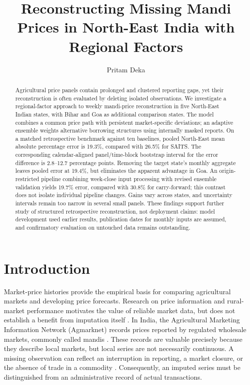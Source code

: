 \documentclass[sigconf,nonacm,balance=false]{acmart}
\begin{document}
\title{Reconstructing Missing Mandi Prices in North-East India with Regional Factors}
\author{Pritam Deka}

\begin{abstract}
Agricultural price panels contain prolonged and clustered reporting gaps, yet their reconstruction is often evaluated by deleting isolated observations. We investigate a regional-factor approach to weekly mandi-price reconstruction in five North-East Indian states, with Bihar and Goa as additional comparison states. The model combines a common price path with persistent market-specific deviations; an adaptive ensemble weights alternative borrowing structures using internally masked reports. On a matched retrospective benchmark against ten baselines, pooled North-East mean absolute percentage error is 19.3\%, compared with 26.5\% for SAITS. The corresponding calendar-aligned panel/time-block bootstrap interval for the error difference is 2.8--12.7 percentage points. Removing the target state's monthly aggregate leaves pooled error at 19.4\%, but eliminates the apparent advantage in Goa. An origin-restricted pipeline combining week-close input processing with revised ensemble validation yields 19.7\% error, compared with 30.8\% for carry-forward; this contrast does not isolate individual pipeline changes. Gains vary across states, and uncertainty intervals remain too narrow in several small panels. These findings support further study of structured retrospective reconstruction, not deployment claims: model development used earlier results, publication dates for monthly inputs are assumed, and confirmatory evaluation on untouched data remains outstanding.
\end{abstract}

\maketitle

\section{Introduction}

Market-price histories provide the empirical basis for comparing agricultural markets and developing price forecasts. Research on price information and rural-market performance motivates the value of reliable market data, but does not establish a benefit from imputation itself \cite{goyal2010}. In India, the Agricultural Marketing Information Network (Agmarknet) records prices reported by regulated wholesale markets, commonly called mandis \cite{agmarknet}. These records are valuable precisely because they describe local markets, but local series are not necessarily continuous. A missing observation can reflect an interruption in reporting, a market closure, or the absence of trade in a commodity \cite{ma2019}. Consequently, an imputed series must be distinguished from an administrative record of actual transactions.
\end{document}
